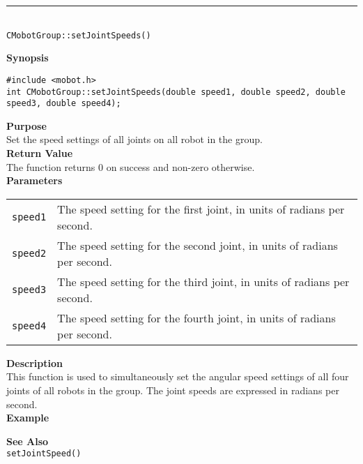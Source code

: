 \noindent
\vspace{5pt}
\rule{4.5in}{0.015in}\\
\noindent
{\LARGE \texttt{CMobotGroup::setJointSpeeds()}}\\
{}

\noindent
{\bf Synopsis}
\vspace{-8pt}
\begin{verbatim}
#include <mobot.h>
int CMobotGroup::setJointSpeeds(double speed1, double speed2, double speed3, double speed4);
\end{verbatim}

\noindent
{\bf Purpose}\\
Set the speed settings of all joints on all robot in the group.\\

\noindent
{\bf Return Value}\\
The function returns 0 on success and non-zero otherwise.\\

\noindent
{\bf Parameters}
\vspace{-0.1in}
\begin{description}
\item               
\begin{tabular}{p{10 mm}p{145 mm}}
\texttt{speed1} & The speed setting for the first joint, in units of radians per second. \\
\texttt{speed2} & The speed setting for the second joint, in units of radians per second. \\
\texttt{speed3} & The speed setting for the third joint, in units of radians per second. \\
\texttt{speed4} & The speed setting for the fourth joint, in units of radians per second. \\
\end{tabular}
\end{description}

\noindent
{\bf Description}\\
This function is used to simultaneously set the angular speed settings of
all four joints of all robots in the group. The joint speeds are expressed in
radians per second. \\

\noindent
{\bf Example}\\
\noindent

\noindent
{\bf See Also}\\
\texttt{setJointSpeed()}

